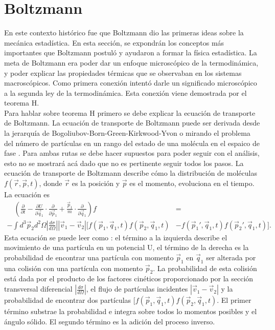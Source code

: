 \section{Boltzmann}
En este contexto histórico fue que Boltzmann dio las primeras ideas sobre la mecánica estadística. En esta sección, se expondrán los conceptos más importantes que Boltzmann postuló y ayudaron a formar la física estadística. La meta de Boltzmann era poder dar un enfoque microscópico de la termodinámica, y poder explicar las propiedades térmicas que se observaban en los sistemas macroscópicos. Como primera conexión intentó darle un significado microscópico a la segunda ley de la termodinámica. Esta conexión viene demostrada por el teorema H.
\\
Para hablar sobre teorema H primero se debe explicar la ecuación de transporte de Boltzmann. La ecuación de transporte de Boltzmann puede ser derivada desde la jerarquía de Bogoliubov-Born-Green-Kirkwood-Yvon o mirando el problema del número de partículas en un rango del estado de una molécula en el espaico de fase \cite{HuangStat}. Para ambas rutas se debe hacer supuestos para poder seguir con el análisis, esto no se mostrará acá dado que no es pertinente seguir todos los pasos. La ecuación de transporte de Boltzmann describe cómo la distribución de moléculas $f(\vec{r},\vec{p},t)$, donde $\vec{r}$ es la posición y $\vec{p}$ es el momento,  evoluciona en el tiempo. La ecuación es 	
\begin{align*}
\quad (\frac{\partial}{\partial t}- \frac{\partial U}{\partial \vec{q}_{1}} \cdot \frac{\partial}{\partial \vec{p}_{1}} +\frac{\vec{p}_{1}}{m} \cdot \frac{\partial}{\partial \vec{q}_{1}})f  &=
\\
- \int d^{3}\vec{p}_{2}d^{2} \Omega |\frac{d \sigma}{d \Omega}| |\vec{v}_{1}-\vec{v}_{2}|[f(\vec{p}_{1},\vec{q}_{1},t)f(\vec{p}_{2},\vec{q}_{1},t) &- f(\vec{p}_{1}',\vec{q}_{1},t)f(\vec{p}_{2}',\vec{q}_{1},t)].
\end{align*}
Esta ecuación se puede leer como \cite{KardarStat}: el término a la izquierda describe el movimiento de una partícula en un potencial U, el término de la derecha es la probabilidad de encontrar una partícula con momento $\vec{p}_{1}$ en $\vec{q}_{1}$ ser alterada por una colisión con una partícula con momento $\vec{p}_{2}$.  La probabilidad de esta colisión está dada por el producto de los factores cinéticos proporcionado por la sección transversal diferencial $ |\frac{d \sigma}{d \Omega}|$, el flujo de partículas incidentes $|\vec{v}_{1}-\vec{v}_{2}|$ y la probabilidad de encontrar dos partículas $[f(\vec{p}_{1},\vec{q}_{1},t)f(\vec{p}_{2},\vec{q}_{1},t)$. El primer término substrae la probabilidad e integra sobre todos lo momentos posibles y el ángulo sólido. El segundo término es la adición del proceso inverso. 
